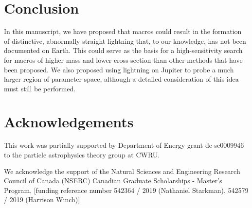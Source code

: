 \documentclass[%
reprint,
 amsmath,amssymb,
 aps,
 prd,
]{revtex4-2}
\begin{document}


\medskip
\section{Conclusion} %
\label{sec:conclusion}

    In this manuscript, we have proposed that macros could result in the formation of distinctive, abnormally straight lightning that, to our knowledge, has not been documented on Earth. This could serve as the basis for a high-sensitivity search for macros of higher mass and lower cross section than other methods that have been proposed. We also proposed using lightning on Jupiter to probe a much larger region of parameter space, although a detailed consideration of this idea must still be performed.



\section{Acknowledgements} %
\label{sec:acknowledgements}

    This work was partially supported by Department of Energy grant de-sc0009946 to the particle astrophysics theory group at CWRU.

    We acknowledge the support of the Natural Sciences and Engineering Research Council of Canada (NSERC) Canadian Graduate Scholarships - Master's Program, [funding reference number 542364 / 2019 (Nathaniel Starkman), 542579 / 2019 (Harrison Winch)]






\end{document}
